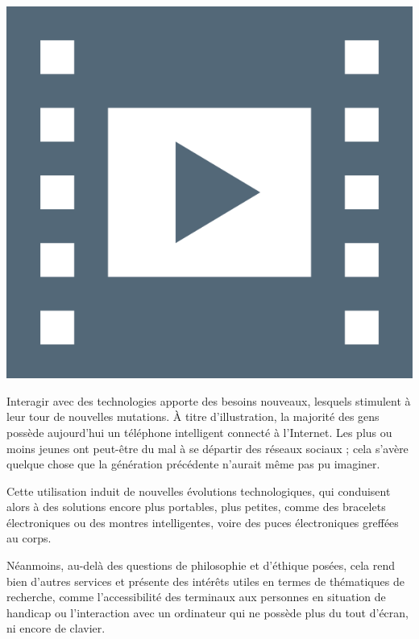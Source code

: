 \begin{marginvideo}
	\vspace*{-36pt}%
	\href{https://www.youtube.com/watch?v=9qmhJwy3LOw}%
	  {\includegraphics[width=\marginparwidth]{./Images/Pictograms/film-strip-dark-electric-blue.png}}%
\end{marginvideo}

Interagir avec des technologies apporte des besoins nouveaux, lesquels stimulent à leur tour de nouvelles mutations. À titre d'illustration, la majorité 
des gens possède aujourd'hui un téléphone intelligent connecté à l'Internet. Les plus ou moins jeunes ont peut-être du mal à se départir des réseaux sociaux ; cela s'avère quelque chose que la génération précédente n'aurait même pas pu imaginer.

Cette utilisation induit de nouvelles évolutions technologiques, qui conduisent alors à des solutions encore plus portables, plus petites, comme des bracelets électroniques ou des montres intelligentes, voire des puces électroniques greffées au corps.

Néanmoins, au-delà des questions de philosophie et d'éthique posées, cela rend bien d'autres services et présente des intérêts utiles en termes de thématiques de recherche, comme l'accessibilité des terminaux aux personnes en situation de handicap ou l'interaction avec un ordinateur qui ne possède plus du tout d'écran, ni encore de clavier.

